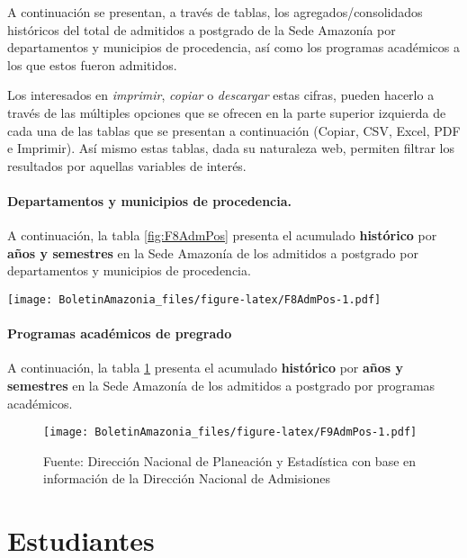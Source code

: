 \documentclass[
]{book}
\begin{document}
A continuación se presentan, a través de tablas, los agregados/consolidados históricos del total de admitidos a postgrado de la Sede Amazonía por departamentos y municipios de procedencia, así como los programas académicos a los que estos fueron admitidos.

Los interesados en \emph{imprimir}, \emph{copiar} o \emph{descargar} estas cifras, pueden hacerlo a través de las múltiples opciones que se ofrecen en la parte superior izquierda de cada una de las tablas que se presentan a continuación (Copiar, CSV, Excel, PDF e Imprimir). Así mismo estas tablas, dada su naturaleza web, permiten filtrar los resultados por aquellas variables de interés.

\hypertarget{departamentos-y-municipios-de-procedencia.-1}{%
\subsubsection{Departamentos y municipios de procedencia.}\label{departamentos-y-municipios-de-procedencia.-1}}

A continuación, la tabla \ref{fig:F8AdmPos} presenta el acumulado \textbf{histórico} por \textbf{años y semestres} en la Sede Amazonía de los admitidos a postgrado por departamentos y municipios de procedencia.

\texttt{[image: BoletinAmazonia\_files/figure-latex/F8AdmPos-1.pdf]}

\hypertarget{programas-acaduxe9micos-de-pregrado-1}{%
\subsubsection{Programas académicos de pregrado}\label{programas-acaduxe9micos-de-pregrado-1}}

A continuación, la tabla \ref{fig:F9AdmPos} presenta el acumulado \textbf{histórico} por \textbf{años y semestres} en la Sede Amazonía de los admitidos a postgrado por programas académicos.

\begin{figure}
\centering
\texttt{[image: BoletinAmazonia\_files/figure-latex/F9AdmPos-1.pdf]}
\caption{\label{fig:F9AdmPos}Fuente: Dirección Nacional de Planeación y Estadística con base en información de la Dirección Nacional de Admisiones}
\end{figure}

\hypertarget{Estudiantes}{%
\chapter{Estudiantes}\label{Estudiantes}}
\end{document}
